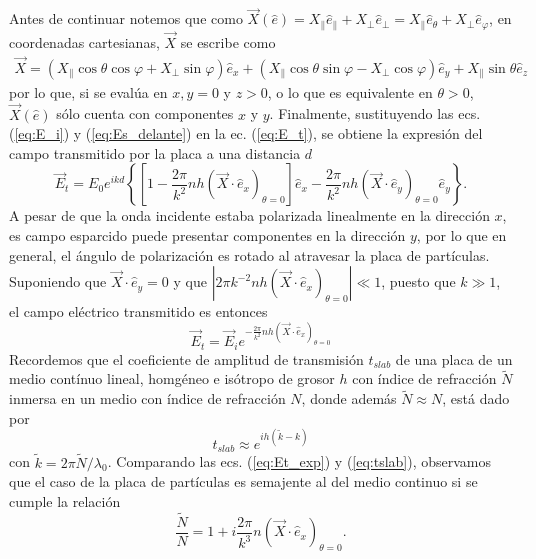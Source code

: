 Antes de continuar notemos que como $\vec{X}(\hat{e}) = X_{\parallel} \hat{e}_{\parallel} + X_{\perp} \hat{e}_{\perp} = X_{\parallel} \hat{e}_{\theta} + X_{\perp} \hat{e}_{\varphi}$, en coordenadas cartesianas, $\vec{X}$ se escribe como
\begin{align}
\vec{X}	= ( X_{\parallel}\cos\theta\cos\varphi + X_\perp \sin\varphi)\hat{e}_x
			 + ( X_{\parallel}\cos\theta\sin\varphi - X_\perp \cos\varphi)\hat{e}_y
			 + X_\parallel \sin\theta \hat{e}_z \label{eq:X}
\end{align}
por lo que, si se evalúa en  $x,y=0$ y $z>0$, o lo que es equivalente en $\theta>0$, $\vec{X}(\hat{e})$ sólo cuenta con componentes $x$ y $y$. Finalmente, sustituyendo las ecs. (\ref{eq:E_i}) y (\ref{eq:Es_delante}) en la ec. (\ref{eq:E_t}), se obtiene la expresión del campo transmitido por la placa a una distancia $d$
\begin{equation}
\vec{E}_t = E_0 e^{ikd} \left\{\left[1-\frac{2\pi}{k^2}nh (\vec{X}\cdot\hat{e}_x)_{\theta=0} \right]\hat{e}_x - \frac{2\pi}{k^2} nh  (\vec{X}\cdot\hat{e}_y)_{\theta=0}\hat{e}_y    \right\}. 
\end{equation}
A pesar de que la onda incidente estaba polarizada linealmente en la dirección $x$, es campo esparcido puede presentar componentes en la dirección $y$, por lo que en general, el ángulo de polarización es rotado al atravesar la placa de partículas. Suponiendo que $\vec{X}\cdot\hat{e}_y = 0$ y que $|2\pi k^{-2} nh (\vec{X}\cdot\hat{e}_x)_{\theta=0}|\ll 1$, puesto que $k\gg 1$, el campo eléctrico transmitido es entonces
\begin{equation}
\vec{E}_t = \vec{E}_i e^{-\frac{2\pi}{k^2}nh (\vec{X}\cdot\hat{e}_x)_{\theta=0}} \label{eq:Et_exp}
\end{equation}
Recordemos que el coeficiente de amplitud de transmisión $t_{slab}$ de una placa de un medio contínuo lineal, homgéneo e isótropo de grosor $h$ con índice de refracción $\tilde{N}$ inmersa en un medio con índice de refracción $N$, donde además $\tilde{N}\approx N$, está dado por
\begin{equation}
t_{slab} \approx e^{ih (\tilde{k}- k)} \label{eq:tslab}
\end{equation}
con $\tilde{k} = 2\pi \tilde{N}/\lambda_0$. Comparando las ecs. (\ref{eq:Et_exp}) y (\ref{eq:tslab}), observamos que el caso de la placa de partículas es semajente al del medio continuo si se cumple la relación
\begin{equation}
\frac{\tilde{N}}{N}= 1 +i \frac{2\pi}{k^3}n (\vec{X}\cdot\hat{e}_x)_{\theta=0}.\label{eq:ÑN}
\end{equation}
